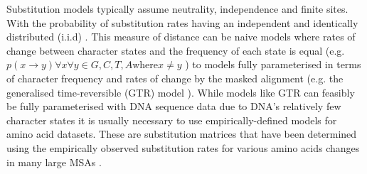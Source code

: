 Substitution models typically assume neutrality, independence and finite sites.
With the probability of substitution rates having an independent and identically
distributed (i.i.d) \citep{Hasegawa1985}.
This measure of distance can be naive models where rates of change between character
states and the frequency of each state is equal (e.g. \(p(x \rightarrow y) \forall x \forall y \in {G,C,T,A} \text{where} x\neq y\)
\citep{jukes1969evolution}) to models fully parameterised in terms of character frequency and rates of change by the masked alignment 
(e.g. the generalised time-reversible (GTR) model \citep{Tavare1986}).
%
%
%
%
%
%
%
%
%
%
%
While models like GTR can feasibly be fully parameterised with DNA sequence
data due to DNA's relatively few character states it is usually necessary
to use empirically-defined models for amino acid datasets.  These are substitution
matrices that have been determined using the empirically observed
substitution rates for various amino acids changes in many large MSAs \citep{Le2008}.



